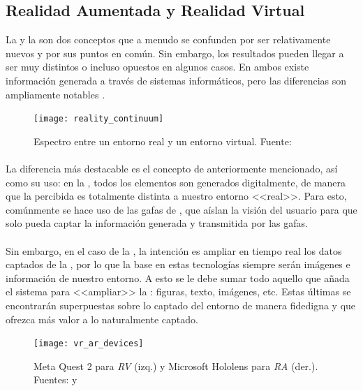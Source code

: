 \documentclass{subfiles}
\begin{document}
        \subsection[Realidad Aumentada y Realidad Virtual]{Realidad Aumentada y Realidad Virtual}
        \label{sec:realidad_aumentada_y_realidad_virtual}

        La \ra y la \rv son dos conceptos que a menudo se confunden por ser relativamente nuevos y por sus puntos en común. Sin embargo, los resultados pueden llegar a ser muy distintos o incluso opuestos en algunos casos. En ambos existe información generada a través de sistemas informáticos, pero las diferencias son ampliamente notables \cite{web:diferencias_ra_rv}.

        \begin{figure}[H]
        \centering
        \texttt{[image: reality\_continuum]}
        \caption[Espectro entre un entorno real y un entorno virtual.]{Espectro entre un entorno real y un entorno virtual. Fuente: }
        \label{fig:reality_continuum}
        \end{figure}

        \paragraph{}
        La diferencia más destacable es el concepto de \realidad anteriormente mencionado, así como su uso: en la \rv, todos los elementos son generados digitalmente, de manera que la \realidad percibida es totalmente distinta a nuestro entorno <<real>>. Para esto, comúnmente se hace uso de las gafas de \rv, que aíslan la visión del usuario para que solo pueda captar la información generada y transmitida por las gafas.
    
        \paragraph{}
        Sin embargo, en el caso de la \ra, la intención es ampliar en tiempo real los datos captados de la \realidad, por lo que la base en estas tecnologías siempre serán imágenes e información de nuestro entorno. A esto se le debe sumar todo aquello que añada el sistema para <<ampliar>> la \realidad: figuras, texto, imágenes, etc. Estas últimas se encontrarán superpuestas sobre lo captado del entorno de manera fidedigna y que ofrezca más valor a lo naturalmente captado.

        \begin{figure}
        \centering
        \texttt{[image: vr\_ar\_devices]}
        \caption[Meta Quest 2 para \textit{RV} (izq.) y Microsoft Hololens para \textit{RA} (der.).]{Meta Quest 2 para \textit{RV} (izq.) y Microsoft Hololens para \textit{RA} (der.). Fuentes:  y }
        \label{fig:vr_ar_devices}
        \end{figure}
    
\end{document}
